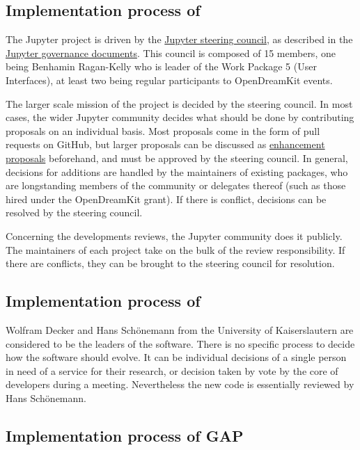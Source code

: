 \documentclass{deliverablereport}
\begin{document}
\subsection{Implementation process of \Jupyter}

The Jupyter project is driven by the \href{https://jupyter.org/about.html}{Jupyter steering council}, as described in the \href{https://github.com/jupyter/governance}{Jupyter governance documents}. This council is composed of 15 members, one being Benhamin Ragan-Kelly who is leader of the Work Package 5 (User Interfaces),  at least two being regular participants to OpenDreamKit events. 

The larger scale mission of the project is decided by the steering council. In most cases, the wider Jupyter community decides what should be done by contributing proposals on an individual basis. Most proposals come in the form of pull requests on GitHub, but larger proposals can be discussed as \href{https://github.com/jupyter/enhancement-proposals}{enhancement proposals} beforehand, and must be approved by the steering council. In general, decisions for additions are handled by the maintainers of existing packages, who are longstanding members of the community or delegates thereof (such as those hired under the OpenDreamKit grant). If there is conflict, decisions can be resolved by the steering council.

Concerning the developments reviews, the Jupyter community does it publicly. The maintainers of each project take on the bulk of the review responsibility. If there are conflicts, they can be brought to the steering council for resolution.


\subsection{Implementation process of \Singular}

Wolfram Decker and Hans Schönemann from the University of Kaiserslautern are considered to be the leaders of the \Singular software. 
There is no specific process to decide how the software should evolve. It can be individual decisions of a single person in need of a service for their research, or decision taken by vote by the core of \Singular developers during a meeting.
Nevertheless the new code is essentially reviewed by Hans Schönemann.

\subsection{Implementation process of GAP}
\end{document}
